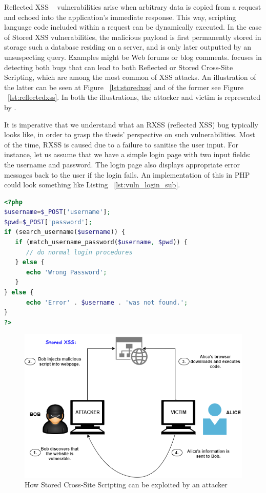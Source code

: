 Reflected XSS ~\cite{rxss_def} vulnerabilities arise when arbitrary data is copied from a request and echoed into the application's immediate response. This way, scripting language code included within a request can be dynamically executed.
In the case of Stored XSS vulnerabilities, the malicious payload is first permanently stored in storage such a database residing on a server, and is only later outputted by an unsuspecting query. Examples might be Web forums or blog comments. 
\pname{} focuses in detecting both bugs that can lead to both Reflected or Stored Cross-Site Scripting, which are among the most common of XSS attacks. An illustration of the latter can be seen at Figure ~\ref{lst:storedxss} and of the former see Figure ~\ref{lst:reflectedxss}. In both the illustrations, the attacker and victim is represented by \pname{}.

It is imperative that we understand what an RXSS (reflected XSS) bug typically looks like, in order to grasp the thesis' perspective on such vulnerabilities. Most of the time, RXSS is caused due to a failure to sanitise the user input. For instance, let us assume that we have a simple login page with two input fields: the username and password. The login page also displays appropriate error messages back to the user if the login fails. An implementation of this in PHP could look something like Listing ~\ref{lst:vuln_login_sub}.

\begin{lstlisting}[language=PHP, caption={Vulnerable login form.}, numbersep=5pt, label={lst:vuln_login_sub}]
<?php
$username=$_POST['username'];
$pwd=$_POST['password'];
if (search_username($username)) {
   if (match_username_password($username, $pwd)) {
      // do normal login procedures
   } else {
      echo 'Wrong Password';
   }
} else {
      echo 'Error' . $username . 'was not found.';
}
?>
\end{lstlisting}

\begin{figure}[ht]
 \centering
 \captionsetup{justification=centering}
 \includegraphics[width=5.0in]{figures/storedxss.png}
 \caption{How Stored Cross-Site Scripting can be exploited by an attacker}
 \label{fig:storedxss}
\end{figure}

